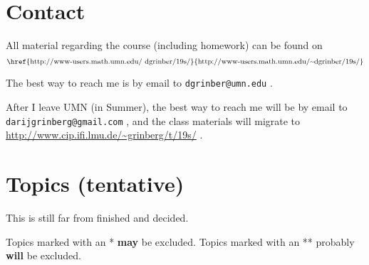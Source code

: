 \documentclass[numbers=enddot,12pt,final,onecolumn,notitlepage]{scrartcl}%
\theoremstyle{definition}
\begin{document}
\section{Contact}

All material regarding the course (including homework) can be found on
\[
\text{\href{http://www-users.math.umn.edu/~dgrinber/19s/}{http://www-users.math.umn.edu/\symbol{126}%
dgrinber/19s/}}%
\]


The best way to reach me is by email to \texttt{dgrinber@umn.edu} .

After I leave UMN (in Summer), the best way to reach me will be by email to
\texttt{darijgrinberg@gmail.com} , and the class materials will migrate to
\url{http://www.cip.ifi.lmu.de/~grinberg/t/19s/} .

\section{Topics (tentative)}

This is still far from finished and decided.

Topics marked with an * \textbf{may} be excluded. Topics marked with an **
probably \textbf{will} be excluded.
\end{document}
